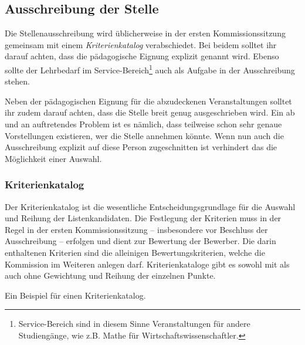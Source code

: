 \subsection{Ausschreibung der Stelle}
Die Stellenausschreibung wird üblicherweise in der ersten Kommissionssitzung gemeinsam mit einem \emph{Kriterienkatalog} verabschiedet. Bei beidem solltet ihr darauf achten, dass die pädagogische Eignung explizit genannt wird. Ebenso sollte der Lehrbedarf im Service-Bereich\footnote{Service-Bereich sind in diesem Sinne Veranstaltungen für andere Studiengänge, wie z.B. Mathe für Wirtschaftswissenschaftler.} auch als Aufgabe in der Ausschreibung stehen.

Neben der pädagogischen Eignung für die abzudeckenen Veranstaltungen solltet ihr zudem darauf achten, dass die Stelle breit genug ausgeschrieben wird. Ein ab und an auftretendes Problem ist es nämlich, dass teilweise schon sehr genaue Vorstellungen existieren, wer die Stelle annehmen könnte. Wenn nun auch die Ausschreibung explizit auf diese Person zugeschnitten ist verhindert das die Möglichkeit einer Auswahl.

\subsubsection*{Kriterienkatalog}\label{kriterienkatalog}
Der Kriterienkatalog ist die wesentliche Entscheidungsgrundlage für die Auswahl und Reihung der Listenkandidaten. Die Festlegung der Kriterien muss in der Regel in der ersten Kommissionssitzung -- insbesondere vor Beschluss der Ausschreibung -- erfolgen und dient zur Bewertung der Bewerber. Die darin enthaltenen Kriterien sind die alleinigen Bewertungskriterien, welche die Kommission im Weiteren anlegen darf. Kriterienkataloge gibt es sowohl mit als auch ohne Gewichtung und Reihung der einzelnen Punkte.

\begin{center}
    \begin{center}
        Ein Beispiel für einen Kriterienkatalog.
    \end{center}
\end{center}

